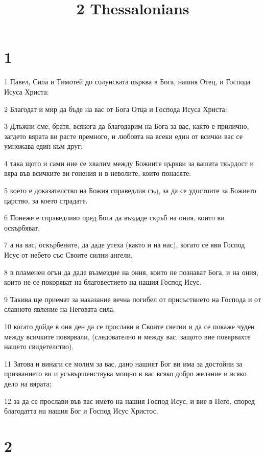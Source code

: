 

\title{2 Thessalonians}


\chapter{1}

\par 1 Павел, Сила и Тимотей до солунската църква в Бога, нашия Отец, и Господа Исуса Христа:
\par 2 Благодат и мир да бъде на вас от Бога Отца и Господа Исуса Христа:
\par 3 Длъжни сме, братя, всякога да благодарим на Бога за вас, както е прилично, загдето вярата ви расте премного, и любовта на всеки един от всички вас се умножава един към друг;
\par 4 така щото и сами ние се хвалим между Божиите църкви за вашата твърдост и вяра във всичките ви гонения и в неволите, които понасяте:
\par 5 което е доказателство на Божия справедлив съд, за да се удостоите за Божието царство, за което страдате.
\par 6 Понеже е справедливо пред Бога да въздаде скръб на ония, които ви оскърбяват,
\par 7 а на вас, оскърбените, да даде утеха (както и на нас), когато се яви Господ Исус от небето със Своите силни ангели,
\par 8 в пламенен огън да даде възмездие на ония, които не познават Бога, и на ония, които не се покоряват на благовестието на нашия Господ Исус.
\par 9 Такива ще приемат за наказание вечна погибел от присъствието на Господа и от славното явление на Неговата сила,
\par 10 когато дойде в оня ден да се прослави в Своите светии и да се покаже чуден между всичките повярвали, (следователно и между вас, защото вие повярвахте нашето свидетелство).
\par 11 Затова и винаги се молим за вас, дано нашият Бог ви има за достойни за призванието ви и усъвършенствува мощно в вас всяко добро желание и всяко дело на вярата;
\par 12 за да се прослави във вас името на нашия Господ Исус, и вие в Него, според благодатта на нашия Бог и Господ Исус Христос.

\chapter{2}

